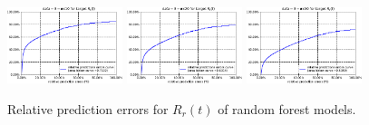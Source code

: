 \documentclass[sigconf]{acmart}
\begin{document}
	\begin{figure} 	
		\includegraphics[width=0.3\textwidth]{fig4/data-3-task-1-7030-windowsize10-RF.pdf} 
		\includegraphics[width=0.3\textwidth]{fig4/data-3-task-1-7030-windowsize20-RF.pdf}
		\includegraphics[width=0.3\textwidth]{fig4/data-3-task-1-7030-windowsize50-RF.pdf}
		\caption{Relative prediction errors for $R_r(t)$ of random forest models.}
		\label{fig:task1_RF}  
	\end{figure}
	
\end{document}
